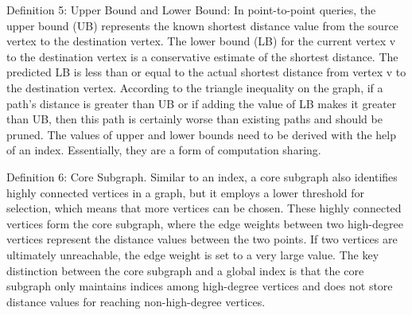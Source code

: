 \documentclass[lettersize,journal]{IEEEtran} %
\begin{document}
Definition 5: Upper Bound and Lower Bound: In point-to-point queries, the upper bound (UB) represents the known shortest distance value from the source vertex to the destination vertex. The lower bound (LB) for the current vertex v to the destination vertex is a conservative estimate of the shortest distance. The predicted LB is less than or equal to the actual shortest distance from vertex v to the destination vertex. According to the triangle inequality on the graph, if a path's distance is greater than UB or if adding the value of LB makes it greater than UB, then this path is certainly worse than existing paths and should be pruned. The values of upper and lower bounds need to be derived with the help of an index. Essentially, they are a form of computation sharing.

Definition 6: Core Subgraph. Similar to an index, a core subgraph also identifies highly connected vertices in a graph, but it employs a lower threshold for selection, which means that more vertices can be chosen. These highly connected vertices form the core subgraph, where the edge weights between two high-degree vertices represent the distance values between the two points. If two vertices are ultimately unreachable, the edge weight is set to a very large value. The key distinction between the core subgraph and a global index is that the core subgraph only maintains indices among high-degree vertices and does not store distance values for reaching non-high-degree vertices.
\end{document}
